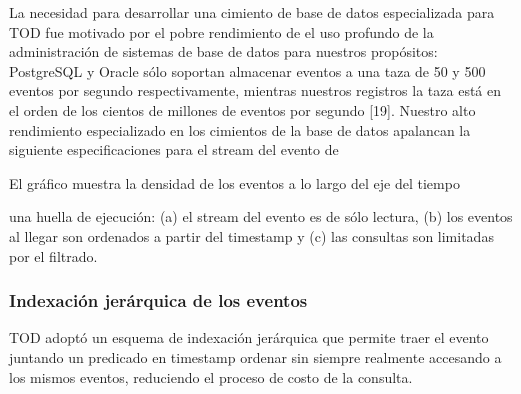 \documentclass[12pt,legalpaper]{report}
\begin{document}
La necesidad para desarrollar una cimiento de base de datos especializada para TOD fue motivado por el pobre rendimiento de el uso profundo de la administración de sistemas de base de datos para nuestros propósitos: PostgreSQL y Oracle sólo soportan almacenar eventos a una taza de 50 y 500 eventos por segundo respectivamente, mientras nuestros registros la taza está en el orden de los cientos de millones de eventos por segundo [19].  Nuestro alto rendimiento especializado en los cimientos de la base de datos apalancan la siguiente especificaciones para el stream del evento de 

El gráfico muestra la densidad de los eventos a lo largo del eje del tiempo

una huella de ejecución: (a) el stream del evento es de sólo lectura, (b) los eventos al llegar son ordenados a partir del timestamp y (c) las consultas son limitadas por el filtrado.

			\subsubsection{Indexación jerárquica de los eventos}

TOD adoptó un esquema de indexación jerárquica que permite traer el evento juntando un predicado en timestamp ordenar sin siempre realmente accesando a los mismos eventos, reduciendo el proceso de costo de la consulta.
\end{document}
